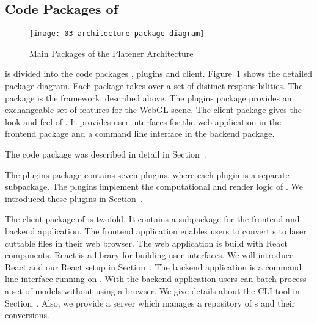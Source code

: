 \documentclass[../../ClassicThesis.tex]{subfiles}
\begin{document}


\subsection{Code Packages of {\platener}}
\label{sec:code-packages-platener}





\begin{figure}
  \centering
  \texttt{[image: 03-architecture-package-diagram]}
  \caption{Main Packages of the Platener Architecture}
  \label{fig:package-diagram}
\end{figure}

{\platener} is divided into the code packages {\convertify},
plugins and client. Figure~\ref{fig:package-diagram}
shows the detailed package diagram. Each package takes over a set of distinct
responsibilities. The {\convertify} package is the framework,
described above. The plugins package provides an exchangeable
set of features for the WebGL scene. The client package gives
the look and feel of {\platener}. It provides user interfaces for the
web application in the frontend package and a command line interface
in the backend package.

The {\convertify} code package was described in detail in
Section~.

The plugins package contains seven plugins, where each plugin is a
separate subpackage. The plugins implement the computational and
render logic of {\platener}. We introduced these plugins in
Section~.


The client package of {\platener} is twofold. It contains a
subpackage for the frontend and backend application. The
frontend application enables users to convert
{\threedmodel}s to laser cuttable files in their web
browser. The web application is build with React components.
React is a {\javascript} library for building user
interfaces. We will introduce React and our React setup in
Section~. The backend application is
a command line interface running on {\nodejs}. With the
backend application users can batch-process a set of models
without using a browser. We give details about the CLI-tool
in Section~. Also, we provide a server
which manages a repository of {\threedmodel}s and their
conversions.
\end{document}
